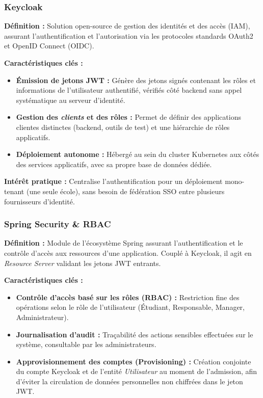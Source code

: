 \documentclass[a4paper,12pt]{article}
\begin{document}
\subsubsection{Keycloak}
\textbf{Définition :} Solution open-source de gestion des identités et des accès (IAM), assurant l'authentification et l'autorisation via les protocoles standards OAuth2 et OpenID Connect (OIDC).

\textbf{Caractéristiques clés :}
\begin{itemize}[label=$\bullet$]
    \item \textbf{Émission de jetons JWT :} Génère des jetons signés contenant les rôles et informations de l'utilisateur authentifié, vérifiés côté backend sans appel systématique au serveur d'identité.
    \item \textbf{Gestion des \textit{clients} et des rôles :} Permet de définir des applications clientes distinctes (backend, outils de test) et une hiérarchie de rôles applicatifs.
    \item \textbf{Déploiement autonome :} Hébergé au sein du cluster Kubernetes aux côtés des services applicatifs, avec sa propre base de données dédiée.
\end{itemize}
\textbf{Intérêt pratique :} Centralise l'authentification pour un déploiement mono-tenant (une seule école), sans besoin de fédération SSO entre plusieurs fournisseurs d'identité.

\subsubsection{Spring Security \& RBAC}
\textbf{Définition :} Module de l'écosystème Spring assurant l'authentification et le contrôle d'accès aux ressources d'une application. Couplé à Keycloak, il agit en \textit{Resource Server} validant les jetons JWT entrants.

\textbf{Caractéristiques clés :}
\begin{itemize}[label=$\bullet$]
    \item \textbf{Contrôle d'accès basé sur les rôles (RBAC) :} Restriction fine des opérations selon le rôle de l'utilisateur (Étudiant, Responsable, Manager, Administrateur).
    \item \textbf{Journalisation d'audit :} Traçabilité des actions sensibles effectuées sur le système, consultable par les administrateurs.
    \item \textbf{Approvisionnement des comptes (Provisioning) :} Création conjointe du compte Keycloak et de l'entité \textit{Utilisateur} au moment de l'admission, afin d'éviter la circulation de données personnelles non chiffrées dans le jeton JWT.
\end{itemize}
\end{document}
